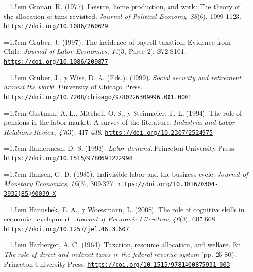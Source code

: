 \documentclass[10pt,a4paper]{article}
\begin{document}
\noindent\hangindent=1.5em Gronau, R. (1977). Leisure, home production, and work: The theory of the allocation of time revisited. \textit{Journal of Political Economy}, \textit{85}(6), 1099-1123. \href{https://doi.org/10.1086/260629}{\nolinkurl{https://doi.org/10.1086/260629}}

\noindent\hangindent=1.5em Gruber, J. (1997). The incidence of payroll taxation: Evidence from Chile. \textit{Journal of Labor Economics}, \textit{15}(3, Parte 2), S72-S101. \href{https://doi.org/10.1086/209877}{\nolinkurl{https://doi.org/10.1086/209877}}

\noindent\hangindent=1.5em Gruber, J., y Wise, D. A. (Eds.). (1999). \textit{Social security and retirement around the world}. University of Chicago Press. \href{https://doi.org/10.7208/chicago/9780226309996.001.0001}{\nolinkurl{https://doi.org/10.7208/chicago/9780226309996.001.0001}}

\noindent\hangindent=1.5em Gustman, A. L., Mitchell, O. S., y Steinmeier, T. L. (1994). The role of pensions in the labor market: A survey of the literature. \textit{Industrial and Labor Relations Review}, \textit{47}(3), 417-438. \href{https://doi.org/10.2307/2524975}{\nolinkurl{https://doi.org/10.2307/2524975}}

\noindent\hangindent=1.5em Hamermesh, D. S. (1993). \textit{Labor demand}. Princeton University Press. \href{https://doi.org/10.1515/9780691222998}{\nolinkurl{https://doi.org/10.1515/9780691222998}}

\noindent\hangindent=1.5em Hansen, G. D. (1985). Indivisible labor and the business cycle. \textit{Journal of Monetary Economics}, \textit{16}(3), 309-327. \href{https://doi.org/10.1016/0304-3932(85)90039-X}{\nolinkurl{https://doi.org/10.1016/0304-3932(85)90039-X}}

\noindent\hangindent=1.5em Hanushek, E. A., y Woessmann, L. (2008). The role of cognitive skills in economic development. \textit{Journal of Economic Literature}, \textit{46}(3), 607-668. \href{https://doi.org/10.1257/jel.46.3.607}{\nolinkurl{https://doi.org/10.1257/jel.46.3.607}}

\noindent\hangindent=1.5em Harberger, A. C. (1964). Taxation, resource allocation, and welfare. En \textit{The role of direct and indirect taxes in the federal revenue system} (pp. 25-80). Princeton University Press. \href{https://doi.org/10.1515/9781400875931-003}{\nolinkurl{https://doi.org/10.1515/9781400875931-003}}
\end{document}
